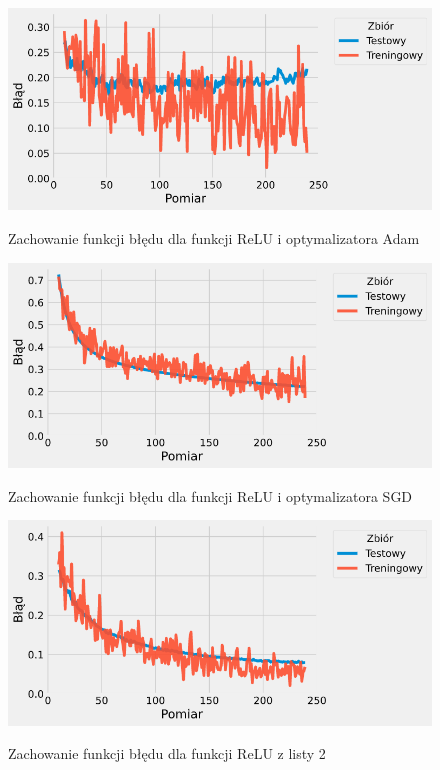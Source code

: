 \documentclass{article}
\begin{document}
\begin{figure}[H]
	\centering
	\caption{Zachowanie funkcji błędu dla funkcji ReLU i optymalizatora Adam}
	\includegraphics[width=\textwidth]{relu_adam_err.png}
	\label{fig:res107}
\end{figure}
\begin{figure}[H]
	\centering
	\caption{Zachowanie funkcji błędu dla funkcji ReLU i optymalizatora SGD}
	\includegraphics[width=\textwidth]{relu_sgd_err.png}
	\label{fig:res108}
\end{figure}
\begin{figure}[H]
	\centering
	\caption{Zachowanie funkcji błędu dla funkcji ReLU z listy 2}
	\includegraphics[width=\textwidth]{relu_2_err.png}
	\label{fig:res109}
\end{figure}
\end{document}

